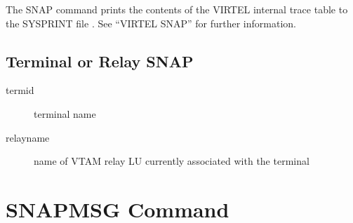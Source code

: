 \documentclass[letterpaper,10pt,english]{sphinxmanual}
\begin{document}
\begin{sphinxVerbatim}[commandchars=\\\{\}]
\end{sphinxVerbatim}

The SNAP command prints the contents of the VIRTEL internal trace table to the SYSPRINT file . See “VIRTEL SNAP” for further information.


\subsection{Terminal or Relay SNAP}
\label{\detokenize{audit_operations_ and_performance:terminal-or-relay-snap}}
\begin{sphinxVerbatim}[commandchars=\\\{\}]
  
\end{sphinxVerbatim}
\begin{description}
\item[{termid}] \leavevmode
terminal name

\item[{relayname}] \leavevmode
name of VTAM relay LU currently associated with the terminal

\end{description}

\ignorespaces 

\section{SNAPMSG Command}
\label{\detokenize{audit_operations_ and_performance:snapmsg-command}}\label{\detokenize{audit_operations_ and_performance:index-20}}
\begin{sphinxVerbatim}[commandchars=\\\{\}]
\PYG{p}{[}\PYG{p}{]}

                        
         
            
\end{sphinxVerbatim}
\end{document}
